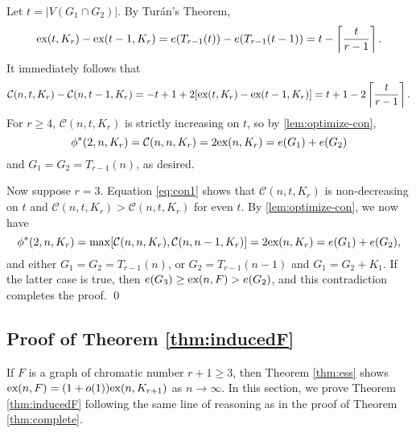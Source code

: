 \documentclass[12pt]{article}
\newcommand*{\ex}{\textnormal{ex}}
\newcommand*{\con}{\mathcal{C}}
\begin{document}
Let $t = |V(G_1 \cap G_2)|$. By Turán's Theorem,
\[
  \ex(t, K_{r}) - \ex(t - 1, K_{r}) = e(T_{r - 1}(t)) - e(T_{r - 1}(t - 1)) = t - \left\lceil \frac{t}{r - 1} \right\rceil.
\]
It immediately follows that
\begin{equation}
  \con(n, t, K_r) - \con(n, t - 1, K_r) = - t + 1 + 2[\ex(t, K_r) - \ex(t - 1, K_r)] = t + 1 - 2\left\lceil \frac{t}{r - 1} \right\rceil. \label{eq:con1}
\end{equation}
For $r \geq 4$, $\con(n, t, K_r)$ is strictly increasing on $t$, so by \cref{lem:optimize-con}, 
\[
  \phi^*(2, n, K_r) = \con(n, n, K_r) = 2\ex(n, K_r) = e(G_1) + e(G_2)
\]
and $G_1 = G_2 = T_{r - 1}(n)$, as desired. 

Now suppose $r = 3$. Equation \eqref{eq:con1} shows that $\con(n, t, K_r)$ is non-decreasing on $t$ and $\con(n, t, K_r) > \con(n, t, K_r)$ for even $t$. By \cref{lem:optimize-con}, we now have 
\[
  \phi^*(2, n, K_r) = \max[\con(n, n, K_r), \con(n, n - 1, K_r)] = 2\ex(n, K_r) = e(G_1) + e(G_2),
\]
and either $G_1 = G_2 = T_{r - 1}(n)$, or $G_2 = T_{r - 1}(n - 1)$ and $G_1 = G_2 + K_1$. If the latter case is true, then $e(G_3) \geq \ex(n, F) > e(G_2)$, and this contradiction completes the proof. \qed

\subsection{Proof of Theorem \ref{thm:inducedF}}

If $F$ is a graph of chromatic number $r + 1 \geq 3$, then Theorem \ref{thm:ess} shows 
$\ex(n,F)= (1 + o(1))\ex(n,K_{r+1})$ as $n \rightarrow \infty$. In this section, we prove Theorem \ref{thm:inducedF} following the same line of reasoning as in the proof of Theorem \ref{thm:complete}.
\end{document}
